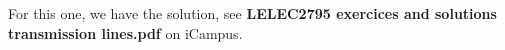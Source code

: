 For this one, we have the solution, see {\bf LELEC2795 exercices and solutions transmission lines.pdf} on iCampus.